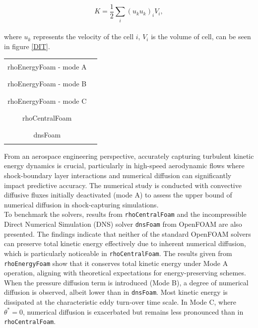 \documentclass[a5paper]{sapthesis}
\begin{document}
	\begin{equation}
		K = \frac{1}{2} \sum_i  (u_{k} u_{k})_i V_i,
	\end{equation}
	\\
	where $u_k$ represents the velocity of the cell $i$, $V_i$ is the volume of cell, can be seen in figure \ref{DIT}.
	\begin{table}[h]
		\centering
		\begin{tabular}{cc}
			\toprule
			rhoEnergyFoam - mode A &  \textcolor{black}{\rule{0.05\linewidth}{0.75mm}} \\
			rhoEnergyFoam - mode B &  \textcolor{blue}{\rule{0.05\linewidth}{0.75mm}} \\
			rhoEnergyFoam - mode C &  \textcolor{red}{\rule{0.05\linewidth}{0.75mm}} \\
			rhoCentralFoam	  	   &  \textcolor{magenta}{\rule{0.05\linewidth}{0.75mm}} \\
			dnsFoam			       &  \textcolor{green}{\rule{0.05\linewidth}{0.75mm}} \\
			\bottomrule
		\end{tabular}
	\end{table}
	From an aerospace engineering perspective, accurately capturing turbulent kinetic energy dynamics is crucial, particularly in high-speed aerodynamic flows where shock-boundary layer interactions and numerical diffusion can significantly impact predictive accuracy. The numerical study is conducted with convective diffusive fluxes initially deactivated (mode A) to assess the upper bound of numerical diffusion in shock-capturing simulations.
	\\
	To benchmark the solvers, results from \texttt{rhoCentralFoam} and the incompressible Direct Numerical Simulation (DNS) solver \texttt{dnsFoam} from OpenFOAM are also presented. The findings indicate that neither of the standard OpenFOAM solvers can preserve total kinetic energy effectively due to inherent numerical diffusion, which is particularly noticeable in \texttt{rhoCentralFoam}. The results given from \texttt{rhoEnergyFoam} show that it conserves total kinetic energy under Mode A operation, aligning with theoretical expectations for energy-preserving schemes.
	\\
	When the pressure diffusion term is introduced (Mode B), a degree of numerical diffusion is observed, albeit lower than in \texttt{dnsFoam}. Most kinetic energy is dissipated at the characteristic eddy turn-over time scale. In Mode C, where $\theta^* = 0$, numerical diffusion is exacerbated but remains less pronounced than in \texttt{rhoCentralFoam}. 
	
\end{document}
